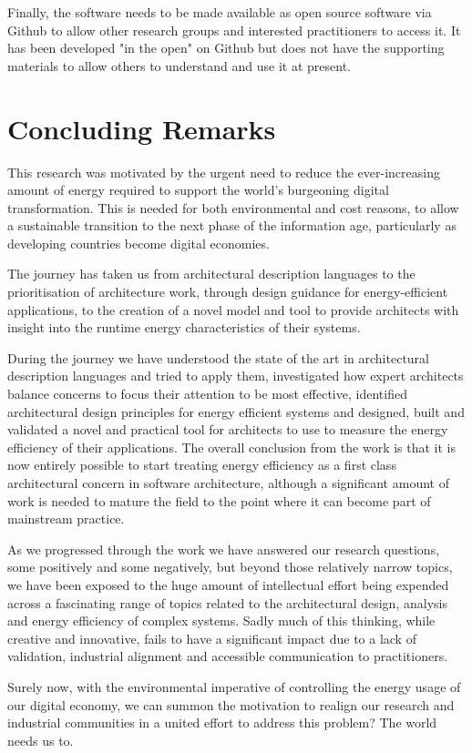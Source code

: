 Finally, the software needs to be made available as open source software via Github to allow other research groups and interested practitioners to access it.  It has been developed "in the open" on Github but does not have the supporting materials to allow others to understand and use it at present.

\section{Concluding Remarks}

This research was motivated by the urgent need to reduce the ever-increasing amount of energy required to support the world's burgeoning digital transformation.  This is needed for both environmental and cost reasons, to allow a sustainable transition to the next phase of the information age, particularly as developing countries become digital economies.

The journey has taken us from architectural description languages to the prioritisation of architecture work, through design guidance for energy-efficient applications, to the creation of a novel model and tool to provide architects with insight into the runtime energy characteristics of their systems.

During the journey we have understood the state of the art in architectural description languages and tried to apply them, investigated how expert architects balance concerns to focus their attention to be most effective, identified architectural design principles for energy efficient systems and designed, built and validated a novel and practical tool for architects to use to measure the energy efficiency of their applications.  The overall conclusion from the work is that it is now entirely possible to start treating energy efficiency as a first class architectural concern in software architecture, although a significant amount of work is needed to mature the field to the point where it can become part of mainstream practice.

As we progressed through the work we have answered our research questions, some positively and some negatively, but beyond those relatively narrow topics, we have been exposed to the huge amount of intellectual effort being expended across a fascinating range of topics related to the architectural design, analysis and energy efficiency of complex systems.  Sadly much of this thinking, while creative and innovative, fails to have a significant impact due to a lack of validation, industrial alignment and accessible communication to practitioners.

Surely now, with the environmental imperative of controlling the energy usage of our digital economy, we can summon the motivation to realign our research and industrial communities in a united effort to address this problem?  The world needs us to.



